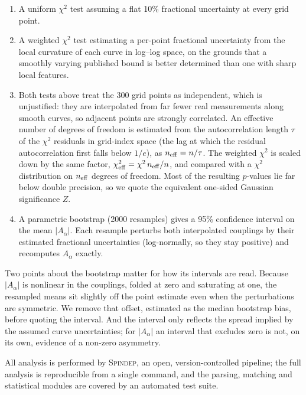 \documentclass[
  aps,
  prd,
  reprint,
  amsmath,
  amssymb,
  nofootinbib,
  superscriptaddress,
  floatfix
]{revtex4-2}
\newcommand{\Aalpha}{A_\alpha}
\begin{document}
\begin{enumerate}
\item A uniform $\chi^2$ test assuming a flat 10\% fractional uncertainty
      at every grid point.
\item A weighted $\chi^2$ test estimating a per-point fractional
      uncertainty from the local curvature of each curve in log--log
      space, on the grounds that a smoothly varying published bound is
      better determined than one with sharp local features.
\item Both tests above treat the 300 grid points as independent, which is
      unjustified: they are interpolated from far fewer real measurements
      along smooth curves, so adjacent points are strongly correlated. An
      effective number of degrees of freedom is estimated from the
      autocorrelation length $\tau$ of the $\chi^2$ residuals in
      grid-index space (the lag at which the residual autocorrelation first
      falls below $1/e$), as $n_{\rm eff}=n/\tau$. The weighted $\chi^2$ is
      scaled down by the same factor, $\chi^2_{\rm eff}=\chi^2\,n_{\rm
      eff}/n$, and compared with a $\chi^2$ distribution on $n_{\rm eff}$
      degrees of freedom. Most of the resulting $p$-values lie far below
      double precision, so we quote the equivalent one-sided Gaussian
      significance $Z$.
\item A parametric bootstrap (2000 resamples) gives a 95\% confidence
      interval on the mean $|\Aalpha|$. Each resample perturbs both
      interpolated couplings by their estimated fractional uncertainties
      (log-normally, so they stay positive) and recomputes $\Aalpha$
      exactly.
\end{enumerate}

Two points about the bootstrap matter for how its intervals are read.
Because $|\Aalpha|$ is nonlinear in the couplings, folded at zero and
saturating at one, the resampled means sit slightly off the point estimate
even when the perturbations are symmetric. We remove that offset, estimated
as the median bootstrap bias, before quoting the interval. And the interval
only reflects the spread implied by the assumed curve uncertainties; for
$|\Aalpha|$ an interval that excludes zero is not, on its own, evidence of a
non-zero asymmetry.

All analysis is performed by \textsc{Spindep}, an open, version-controlled
pipeline; the full analysis is reproducible from a single command, and the
parsing, matching and statistical modules are covered by an automated test
suite.
\end{document}
